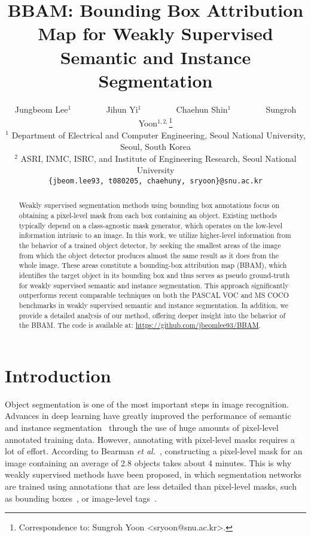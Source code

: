 \documentclass[final]{cvpr}
\begin{document}
\title{BBAM: Bounding Box Attribution Map for Weakly Supervised \\Semantic and Instance Segmentation}


\author{Jungbeom Lee$^1$ ~~~~~~~ Jihun Yi$^1$ ~~~~~~~ Chaehun Shin$^1$  ~~~~~~~  Sungroh Yoon$^{1, 2, }$\thanks{Correspondence to: Sungroh Yoon <sryoon@snu.ac.kr>.}\\
$^1$ Department of Electrical and Computer Engineering, Seoul National University, Seoul, South Korea\\
$^2$ ASRI, INMC, ISRC, and Institute of Engineering Research, Seoul National University\\
{\tt\small \{jbeom.lee93, t080205, chaehuny, sryoon\}@snu.ac.kr}}

\maketitle


\begin{abstract}
Weakly supervised segmentation methods using bounding box annotations focus on obtaining a pixel-level mask from each box containing an object. Existing methods typically depend on a class-agnostic mask generator, which operates on the low-level information intrinsic to an image. In this work, we utilize higher-level information from the behavior of a trained object detector, by seeking the smallest areas of the image from which the object detector produces almost the same result as it does from the whole image. These areas constitute a bounding-box attribution map (BBAM), which identifies the target object in its bounding box and thus serves as pseudo ground-truth for weakly supervised semantic and instance segmentation. This approach significantly outperforms recent comparable techniques on both the PASCAL VOC and MS COCO benchmarks in weakly supervised semantic and instance segmentation. In addition, we provide a detailed analysis of our method, offering deeper insight into the behavior of the BBAM.
The code is available at: \url{https://github.com/jbeomlee93/BBAM}.

\end{abstract}

\thispagestyle{empty}
\section{Introduction}
Object segmentation is one of the most important steps in image recognition.
Advances in deep learning have greatly improved the performance of semantic and instance segmentation~\cite{he2017mask, chen2017deeplab} through the use of huge amounts of pixel-level annotated training data. 
However, annotating with pixel-level masks requires a lot of effort. According to Bearman \textit{et al.}~\cite{bearman2016s}, constructing a pixel-level mask for an image containing an average of 2.8 objects takes about 4 minutes.
This is why weakly supervised methods have been proposed, in which segmentation networks are trained using annotations that are less detailed than pixel-level masks, such as bounding boxes~\cite{song2019box, khoreva2017simple, dai2015boxsup}, or image-level tags~\cite{lee2019ficklenet, ahn2019weakly, ahn2018learning}.
\end{document}
